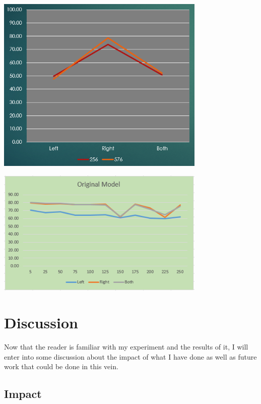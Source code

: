 \documentclass[]{report}
\begin{document}
\begin{minipage}{\linewidth}
	\begin{minipage}{0.49\textwidth}
		\centering
		\includegraphics[width=0.75\textwidth]{../images/accuracy-deep}
	\end{minipage}
	\hfill
	\begin{minipage}{0.49\textwidth}
		\centering
		\includegraphics[width=0.75\textwidth]{../images/handed-original}
	\end{minipage}
\end{minipage}

\chapter{Discussion}

Now that the reader is familiar with my experiment and the results of it, I will enter into some discussion about the impact of what I have done as well as future work that could be done in this vein.

\section{Impact}
\end{document}
